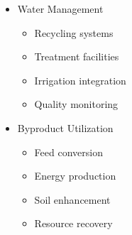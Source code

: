 \begin{itemize}
\begin{itemize}
        \item Water Management
        \begin{itemize}
            \item Recycling systems
            \item Treatment facilities
            \item Irrigation integration
            \item Quality monitoring
        \end{itemize}
        
        \item Byproduct Utilization
        \begin{itemize}
            \item Feed conversion
            \item Energy production
            \item Soil enhancement
            \item Resource recovery
        \end{itemize}
    \end{itemize}
\end{itemize}

